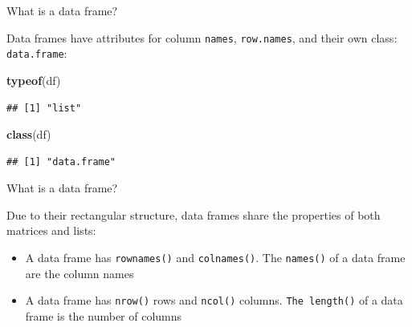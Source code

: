 \documentclass[ignorenonframetext,]{beamer}
\newenvironment{Shaded}{\begin{snugshade}}{\end{snugshade}}
\newcommand{\KeywordTok}[1]{\textcolor[rgb]{0.13,0.29,0.53}{\textbf{#1}}}
\newcommand{\NormalTok}[1]{#1}
\begin{document}
\begin{frame}[fragile]{What is a data frame?}
\protect\hypertarget{what-is-a-data-frame-2}{}

Data frames have attributes for column \texttt{names},
\texttt{row.names}, and their own class: \texttt{data.frame}:

\begin{Shaded}
\begin{Highlighting}[]
\KeywordTok{typeof}\NormalTok{(df) }
\end{Highlighting}
\end{Shaded}

\begin{verbatim}
## [1] "list"
\end{verbatim}

\begin{Shaded}
\begin{Highlighting}[]
\KeywordTok{class}\NormalTok{(df) }
\end{Highlighting}
\end{Shaded}

\begin{verbatim}
## [1] "data.frame"
\end{verbatim}

\end{frame}

\begin{frame}[fragile]{What is a data frame?}
\protect\hypertarget{what-is-a-data-frame-3}{}

Due to their rectangular structure, data frames share the properties of
both matrices and lists:

\begin{itemize}
\item
  A data frame has \texttt{rownames()} and \texttt{colnames()}. The
  \texttt{names()} of a data frame are the column names
\item
  A data frame has \texttt{nrow()} rows and \texttt{ncol()} columns.
  \texttt{The\ length()} of a data frame is the number of columns
\end{itemize}

\end{frame}
\end{document}
